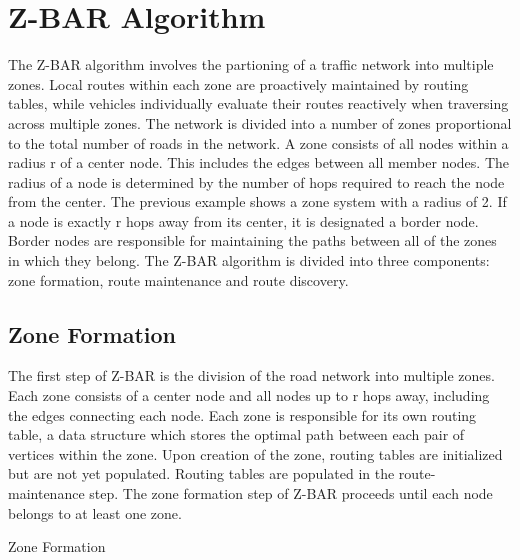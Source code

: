 \documentclass[conference]{IEEEtran}
\begin{document}
\section{Z-BAR Algorithm} %

The Z-BAR algorithm involves the partioning of a traffic network into multiple zones. Local routes within each zone are proactively maintained by routing tables, while vehicles individually evaluate their routes reactively when traversing across multiple zones. The network is divided into a number of zones proportional to the total number of roads in the network. A zone consists of all nodes within a radius r of a center node. This includes the edges between all member nodes. The radius of a node is determined by the number of hops required to reach the node from the center. The previous example shows a zone system with a radius of 2. If a node is exactly r hops away from its center, it is designated a border node. Border nodes are responsible for maintaining the paths between all of the zones in which they belong. The Z-BAR algorithm is divided into three components: zone formation, route maintenance and route discovery.

\subsection{Zone Formation}

The first step of Z-BAR is the division of the road network into multiple zones. Each zone consists of a center node and all nodes up to r hops away, including the edges connecting each node. Each zone is responsible for its own routing table, a data structure which stores the optimal path between each pair of vertices within the zone. Upon creation of the zone, routing tables are initialized but are not yet populated. Routing tables are populated in the route-maintenance step. The zone formation step of Z-BAR proceeds until each node belongs to at least one zone.

\begin{algorithm}[H]
  \caption{Zone Formation}
  \label{zone_formation}
  \begin{algorithmic}[1] %
    \EndIf
  \EndFor
  \EndProcedure
  \end{algorithmic}
\end{algorithm}
\end{document}
